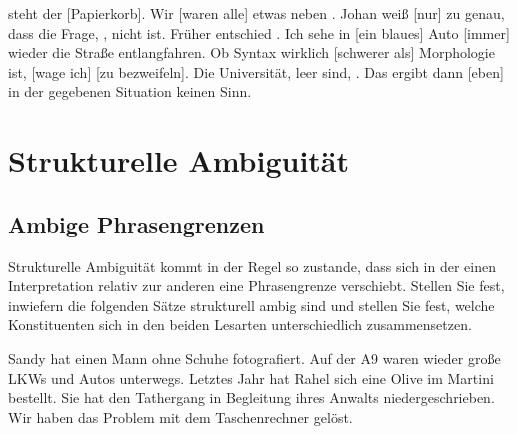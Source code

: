 \begin{exe}
  \ex{}  steht der [Papierkorb].
  \ex{} Wir [waren alle] etwas neben .
  \ex{} Johan weiß [nur] zu genau, dass die Frage, , nicht  ist.
  \ex{} Früher entschied     .
  \ex{} Ich sehe in  [ein blaues] Auto [immer] wieder die Straße entlangfahren.
  \ex{} Ob Syntax wirklich [schwerer als] Morphologie ist, [wage ich] [zu bezweifeln].
  \ex{} Die Universität,  leer sind, .
  \ex{} Das ergibt dann [eben] in der gegebenen Situation keinen Sinn.
\end{exe}


\section{Strukturelle Ambiguität}

\subsection{Ambige Phrasengrenzen}

Strukturelle Ambiguität kommt in der Regel so zustande, dass sich in der einen Interpretation relativ zur anderen eine Phrasengrenze verschiebt.
Stellen Sie fest, inwiefern die folgenden Sätze strukturell ambig sind und stellen Sie fest, welche Konstituenten sich in den beiden Lesarten unterschiedlich zusammensetzen.

\begin{exe}
  \ex Sandy hat einen Mann ohne Schuhe fotografiert.\label{ex:schuhe}
  \ex Auf der A9 waren wieder große LKWs und Autos unterwegs.\label{ex:a9}
  \ex Letztes Jahr hat Rahel sich eine Olive im Martini bestellt.\label{ex:rahel}
  \ex Sie hat den Tathergang in Begleitung ihres Anwalts niedergeschrieben.\label{ex:tathergang}
  \ex Wir haben das Problem mit dem Taschenrechner gelöst.\label{ex:problem}
\end{exe}

\Halbzeile

